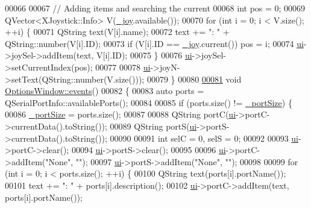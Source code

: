 \begin{DoxyCode}
00066     
00067     \textcolor{comment}{// Adding items and searching the current}
00068     \textcolor{keywordtype}{int} pos = 0;
00069     QVector<XJoystick::Info> V(\hyperlink{a00005_a1bf846ab681ab245f70adac30999947c}{\_joy}.available());
00070     \textcolor{keywordflow}{for} (\textcolor{keywordtype}{int} i = 0; i < V.size(); ++i) \{
00071         QString text(V[i].name);
00072         text += \textcolor{stringliteral}{": "} + QString::number(V[i].ID);
00073         \textcolor{keywordflow}{if} (V[i].ID == \hyperlink{a00005_a1bf846ab681ab245f70adac30999947c}{\_joy}.current()) pos = i;
00074         \hyperlink{a00005_a8347442d5b3b670e8fff0c4102db1f88}{ui}->joySel->addItem(text, V[i].ID);
00075     \}
00076     \hyperlink{a00005_a8347442d5b3b670e8fff0c4102db1f88}{ui}->joySel->setCurrentIndex(pos);
00077     
00078     \hyperlink{a00005_a8347442d5b3b670e8fff0c4102db1f88}{ui}->joyN->setText(QString::number(V.size()));
00079 \}
00080 
\hypertarget{a00017_source_l00081}{}\hyperlink{a00005_a18763ff318688083c7ee5a21f22e8e98}{00081} \textcolor{keywordtype}{void} \hyperlink{a00005_a18763ff318688083c7ee5a21f22e8e98}{OptionsWindow::events}()
00082 \{
00083     \textcolor{keyword}{auto} ports = QSerialPortInfo::availablePorts();
00084     
00085     \textcolor{keywordflow}{if} (ports.size() != \hyperlink{a00005_a9bd4dccc7a544b1db78dc8cf330b88f6}{\_portSize}) \{
00086         \hyperlink{a00005_a9bd4dccc7a544b1db78dc8cf330b88f6}{\_portSize} = ports.size();
00087         
00088         QString portC(\hyperlink{a00005_a8347442d5b3b670e8fff0c4102db1f88}{ui}->portC->currentData().toString());
00089         QString portS(\hyperlink{a00005_a8347442d5b3b670e8fff0c4102db1f88}{ui}->portS->currentData().toString());
00090         
00091         \textcolor{keywordtype}{int} selC = 0, selS = 0;
00092         
00093         \hyperlink{a00005_a8347442d5b3b670e8fff0c4102db1f88}{ui}->portC->clear();
00094         \hyperlink{a00005_a8347442d5b3b670e8fff0c4102db1f88}{ui}->portS->clear();
00095         
00096         \hyperlink{a00005_a8347442d5b3b670e8fff0c4102db1f88}{ui}->portC->addItem(\textcolor{stringliteral}{"None"}, \textcolor{stringliteral}{""});
00097         \hyperlink{a00005_a8347442d5b3b670e8fff0c4102db1f88}{ui}->portS->addItem(\textcolor{stringliteral}{"None"}, \textcolor{stringliteral}{""});
00098         
00099         \textcolor{keywordflow}{for} (\textcolor{keywordtype}{int} i = 0; i < ports.size(); ++i) \{
00100             QString text(ports[i].portName());
00101             text += \textcolor{stringliteral}{": "} + ports[i].description();
00102             \hyperlink{a00005_a8347442d5b3b670e8fff0c4102db1f88}{ui}->portC->addItem(text, ports[i].portName());

\end{DoxyCode}
